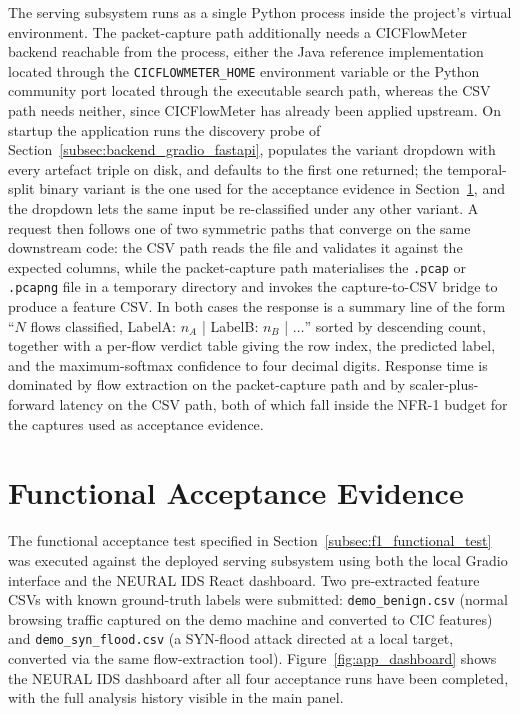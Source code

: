 \par The serving subsystem runs as a single Python process inside the project's virtual environment. The packet-capture path additionally needs a CICFlowMeter backend reachable from the process, either the Java reference implementation located through the \texttt{CICFLOWMETER\_HOME} environment variable or the Python community port located through the executable search path, whereas the CSV path needs neither, since CICFlowMeter has already been applied upstream. On startup the application runs the discovery probe of Section~\ref{subsec:backend_gradio_fastapi}, populates the variant dropdown with every artefact triple on disk, and defaults to the first one returned; the temporal-split binary variant is the one used for the acceptance evidence in Section~\ref{sec:f1_acceptance_evidence}, and the dropdown lets the same input be re-classified under any other variant. A request then follows one of two symmetric paths that converge on the same downstream code: the CSV path reads the file and validates it against the expected columns, while the packet-capture path materialises the \texttt{.pcap} or \texttt{.pcapng} file in a temporary directory and invokes the capture-to-CSV bridge to produce a feature CSV. In both cases the response is a summary line of the form \enquote{$N$ flows classified, LabelA: $n_A$ | LabelB: $n_B$ | $\dots$} sorted by descending count, together with a per-flow verdict table giving the row index, the predicted label, and the maximum-softmax confidence to four decimal digits. Response time is dominated by flow extraction on the packet-capture path and by scaler-plus-forward latency on the CSV path, both of which fall inside the NFR-1 budget for the captures used as acceptance evidence.

\section{Functional Acceptance Evidence}
\label{sec:f1_acceptance_evidence}

\par The functional acceptance test specified in Section~\ref{subsec:f1_functional_test} was executed against the deployed serving subsystem using both the local Gradio interface and the NEURAL IDS React dashboard. Two pre-extracted feature CSVs with known ground-truth labels were submitted: \texttt{demo\_benign.csv} (normal browsing traffic captured on the demo machine and converted to CIC features) and \texttt{demo\_syn\_flood.csv} (a SYN-flood attack directed at a local target, converted via the same flow-extraction tool). Figure~\ref{fig:app_dashboard} shows the NEURAL IDS dashboard after all four acceptance runs have been completed, with the full analysis history visible in the main panel.

